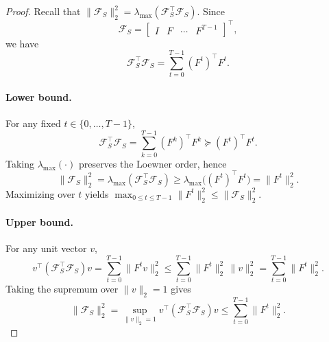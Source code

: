 \begin{proof}
Recall that $\|\mathcal F_S\|_2^2=\lambda_{\max}(\mathcal F_S^\top \mathcal F_S)$. Since
\[
\mathcal F_S=\begin{bmatrix}I & F & \cdots & F^{T-1}\end{bmatrix}^\top,
\]
we have
\[
\mathcal F_S^\top \mathcal F_S=\sum_{t=0}^{T-1}(F^t)^\top F^t.
\]

\paragraph{Lower bound.}
For any fixed $t\in\{0,\dots,T-1\}$,
\[
\mathcal F_S^\top \mathcal F_S
=\sum_{k=0}^{T-1}(F^k)^\top F^k
\succeq (F^t)^\top F^t.
\]
Taking $\lambda_{\max}(\cdot)$ preserves the Loewner order, hence
\[
\|\mathcal F_S\|_2^2
=\lambda_{\max}(\mathcal F_S^\top \mathcal F_S)
\ge \lambda_{\max}\big((F^t)^\top F^t\big)
=\|F^t\|_2^2.
\]
Maximizing over $t$ yields
$\max_{0\le t\le T-1}\|F^t\|_2^2 \le \|\mathcal F_S\|_2^2$.

\paragraph{Upper bound.}
For any unit vector $v$,
\[
v^\top(\mathcal F_S^\top \mathcal F_S)v
=\sum_{t=0}^{T-1}\|F^t v\|_2^2
\le \sum_{t=0}^{T-1}\|F^t\|_2^2\,\|v\|_2^2
=\sum_{t=0}^{T-1}\|F^t\|_2^2.
\]
Taking the supremum over $\|v\|_2=1$ gives
\[
\|\mathcal F_S\|_2^2
=\sup_{\|v\|_2=1} v^\top(\mathcal F_S^\top \mathcal F_S)v
\le \sum_{t=0}^{T-1}\|F^t\|_2^2.
\]
\end{proof}


